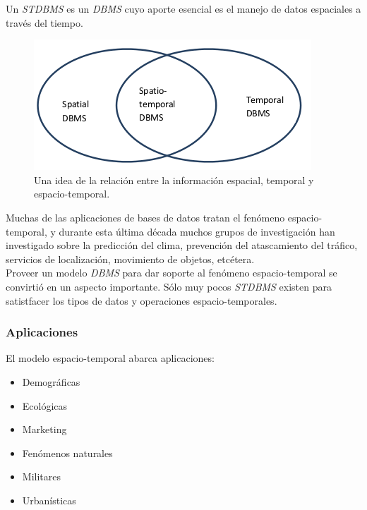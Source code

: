 \documentclass[a4paper,12pt,oneside]{report}
\begin{document}
Un \textit{STDBMS} es un \textit{DBMS} cuyo aporte esencial es el manejo de datos espaciales a trav\'es del tiempo.

\begin{figure}[h]
\center
\begin{minipage}{.4\textwidth}
\includegraphics[width=\textwidth]{images/figure1.png}
\caption{Una idea de la relaci\'on entre la informaci\'on espacial, temporal y espacio-temporal.}
\end{minipage}
\end{figure}

\noindent Muchas de las aplicaciones de bases de datos tratan el fen\'omeno espacio-temporal, y durante esta \'ultima d\'ecada muchos grupos de investigaci\'on han investigado sobre la predicci\'on del clima, prevenci\'on del atascamiento del tr\'afico, servicios de localizaci\'on, movimiento de objetos, etc\'etera.\\
Proveer un modelo \textit{DBMS} para dar soporte al fen\'omeno espacio-temporal se convirti\'o en un aspecto importante. S\'olo muy pocos \textit{STDBMS} existen para satistfacer los tipos de datos y operaciones espacio-temporales.

\subsubsection*{Aplicaciones}
El modelo espacio-temporal abarca aplicaciones:
\begin{itemize}
\item Demogr\'aficas
\item Ecol\'ogicas
\item Marketing
\item Fen\'omenos naturales
\item Militares
\item Urban\'isticas
\end{itemize}
\end{document}
